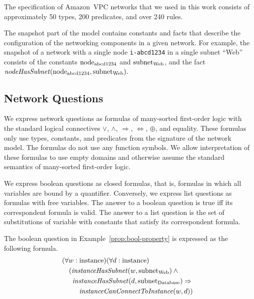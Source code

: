 The specification of Amazon~VPC networks that we used in this work consists of approximately 50 types, 200 predicates, and over 240 rules.

The snapshot part of the model contains constants and facts that describe the configuration of the networking components in a given network. For example, the snapshot of a network with a single node \verb'i-abcd1234' in a single subnet ``Web'' consists of the constants $\mathrm{node}_\text{abcd1234}$ and $\mathrm{subnet}_\text{Web}$, and the fact $\mathit{nodeHasSubnet}(\mathrm{node}_\text{abcd1234},\mathrm{subnet}_\text{Web}).$


\subsection{Network Questions}
\label{sect:aws/reachability/properties}

We express network questions as formulas of many-sorted first-order logic with the standard logical connectives $\vee$, $\wedge$, $\Rightarrow$, $\Leftrightarrow$, $\oplus$, and equality. These formulas only use types, constants, and predicates from the signature of the network model. The formulas do not use any function symbols. We allow interpretation of these formulas to use empty domains and otherwise assume the standard semantics of many-sorted first-order logic.

We express boolean questions as closed formulas, that is, formulas in which all variables are bound by a quantifier. Conversely, we express list questions as formulas with free variables. The answer to a boolean question is true iff its correspondent formula is valid. The answer to a list question is the set of substitutions of variable with constants that satisfy its correspondent formula.

The boolean question in Example~\ref{prop:bool-property} is expressed as the following formula.
\begin{equation}\label{eq:bool-property}
\begin{aligned}
&(\forall w:\mathrm{instance})(\forall d:\mathrm{instance})\\
&\quad(\mathit{instanceHasSubnet}(w, \mathrm{subnet}_\text{Web})\:\wedge\:\\
&\quad\,\,\,\mathit{instanceHasSubnet}(d, \mathrm{subnet}_\text{Database}) \Rightarrow~\\
&\quad\,\,\,\quad\mathit{instanceCanConnectToInstance}(w,d))
\end{aligned}
\end{equation}

